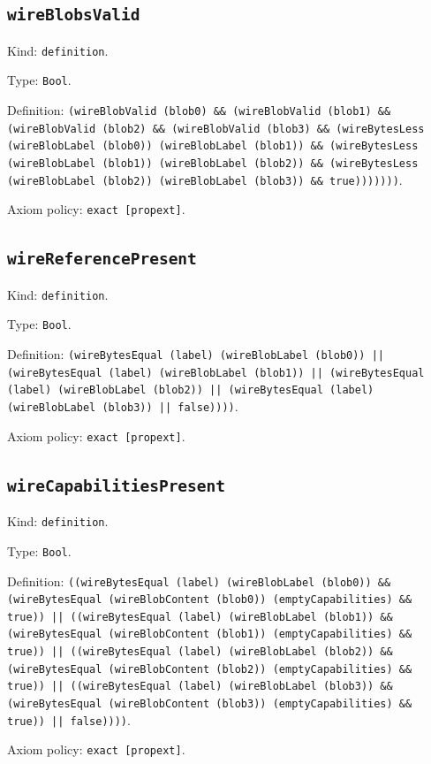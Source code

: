 \documentclass[11pt]{article}
\begin{document}
\subsection*{\texttt{wireBlobsValid}}
\noindent Kind: \texttt{definition}.\par
\noindent Type: \texttt{Bool}.\par
\noindent Definition: \texttt{(wireBlobValid (blob0) \&\& (wireBlobValid (blob1) \&\& (wireBlobValid (blob2) \&\& (wireBlobValid (blob3) \&\& (wireBytesLess (wireBlobLabel (blob0)) (wireBlobLabel (blob1)) \&\& (wireBytesLess (wireBlobLabel (blob1)) (wireBlobLabel (blob2)) \&\& (wireBytesLess (wireBlobLabel (blob2)) (wireBlobLabel (blob3)) \&\& true)))))))}.\par
\noindent Axiom policy: \texttt{exact [propext]}.\par
\subsection*{\texttt{wireReferencePresent}}
\noindent Kind: \texttt{definition}.\par
\noindent Type: \texttt{Bool}.\par
\noindent Definition: \texttt{(wireBytesEqual (label) (wireBlobLabel (blob0)) || (wireBytesEqual (label) (wireBlobLabel (blob1)) || (wireBytesEqual (label) (wireBlobLabel (blob2)) || (wireBytesEqual (label) (wireBlobLabel (blob3)) || false))))}.\par
\noindent Axiom policy: \texttt{exact [propext]}.\par
\subsection*{\texttt{wireCapabilitiesPresent}}
\noindent Kind: \texttt{definition}.\par
\noindent Type: \texttt{Bool}.\par
\noindent Definition: \texttt{((wireBytesEqual (label) (wireBlobLabel (blob0)) \&\& (wireBytesEqual (wireBlobContent (blob0)) (emptyCapabilities) \&\& true)) || ((wireBytesEqual (label) (wireBlobLabel (blob1)) \&\& (wireBytesEqual (wireBlobContent (blob1)) (emptyCapabilities) \&\& true)) || ((wireBytesEqual (label) (wireBlobLabel (blob2)) \&\& (wireBytesEqual (wireBlobContent (blob2)) (emptyCapabilities) \&\& true)) || ((wireBytesEqual (label) (wireBlobLabel (blob3)) \&\& (wireBytesEqual (wireBlobContent (blob3)) (emptyCapabilities) \&\& true)) || false))))}.\par
\noindent Axiom policy: \texttt{exact [propext]}.\par
\end{document}
